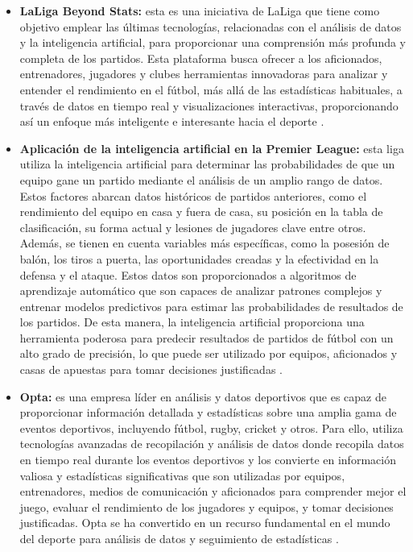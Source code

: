 \begin{itemize}
\item \textbf{LaLiga Beyond Stats:}
esta es una iniciativa de LaLiga que tiene como objetivo emplear las últimas tecnologías, relacionadas con el análisis de datos y la inteligencia artificial, para proporcionar una comprensión más profunda y completa de los partidos. Esta plataforma busca ofrecer a los aficionados, entrenadores, jugadores y clubes herramientas innovadoras para analizar y entender el rendimiento en el fútbol, más allá de las estadísticas habituales, a través de datos en tiempo real y visualizaciones interactivas, proporcionando así un enfoque más inteligente e interesante hacia el deporte \cite{beyondstats}.

\item \textbf{Aplicación de la inteligencia artificial en la Premier League:}
esta liga utiliza la inteligencia artificial para determinar las probabilidades de que un equipo gane un partido mediante el análisis de un amplio rango de datos. Estos factores abarcan datos históricos de partidos anteriores, como el rendimiento del equipo en casa y fuera de casa, su posición en la tabla de clasificación, su forma actual y lesiones de jugadores clave entre otros. Además, se tienen en cuenta variables más específicas, como la posesión de balón, los tiros a puerta, las oportunidades creadas y la efectividad en la defensa y el ataque. Estos datos son proporcionados a algoritmos de aprendizaje automático que son capaces de analizar patrones complejos y entrenar modelos predictivos para estimar las probabilidades de resultados de los partidos. De esta manera, la inteligencia artificial proporciona una herramienta poderosa para predecir resultados de partidos de fútbol con un alto grado de precisión, lo que puede ser utilizado por equipos, aficionados y casas de apuestas para tomar decisiones justificadas \cite{oracle} \cite{iaFutbol}.

\item \textbf{Opta:}
es una empresa líder en análisis y datos deportivos que es capaz de proporcionar información detallada y estadísticas sobre una amplia gama de eventos deportivos, incluyendo fútbol, rugby, cricket y otros. Para ello, utiliza tecnologías avanzadas de recopilación y análisis de datos donde recopila datos en tiempo real durante los eventos deportivos y los convierte en información valiosa y estadísticas significativas que son utilizadas por equipos, entrenadores, medios de comunicación y aficionados para comprender mejor el juego, evaluar el rendimiento de los jugadores y equipos, y tomar decisiones justificadas. Opta se ha convertido en un recurso fundamental en el mundo del deporte para análisis de datos y seguimiento de estadísticas \cite{opta}.



\end{itemize}



